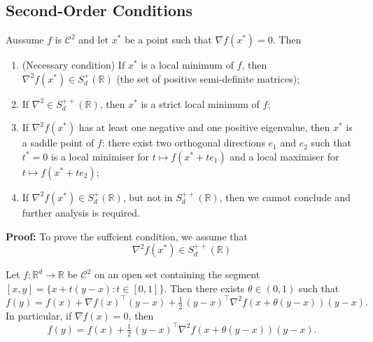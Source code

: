 \subsection{Second-Order Conditions}
Aussume \(f\) is \(\mathscr{C}^2\) and let \(x^*\) be a point such that \(\nabla f(x^*) = 0\). Then
\begin{enumerate}
    \item (Necessary condition) If \(x^*\) is a local minimum of \(f\), then \(\nabla^2 f(x^*) \in S_d^{+}(\mathbb{R})\) (the set of positive semi-definite matrices);
    \item If \(\nabla^2 \in S_d^{++}(\mathbb{R})\), then \(x^*\) is a strict local minimum of \(f\);
    \item If \(\nabla^2 f(x^*)\) has at least one negative and one positive eigenvalue, then \(x^*\) is a saddle point of \(f\): there exist 
    two orthogonal directions \(e_1\) and \(e_2\) such that \(t^*=0\) is a local minimiser for \(t \mapsto f(x^*+te_1)\) and a local maximiser for \(t \mapsto f(x^*+te_2)\);
    \item If \(\nabla^2 f(x^*) \in S_d^{+}(\mathbb{R})\), but not in \(S_d^{++}(\mathbb{R})\), then we cannot conclude and further analysis is required.
\end{enumerate}

\textbf{Proof:} To prove the suffcient condition, we assume that 
    \begin{equation}
        \nabla^2 f(x^*) \in S_d^{++}(\mathbb{R})
        \label{eq:posdef}
    \end{equation}

    \begin{proposition}
        Let $f:\mathbb{R}^d\to\mathbb{R}$ be $\mathscr{C}^2$ on an open set containing the segment $[x,y]=\{x+t(y-x):t\in[0,1]\}$. Then there exists $\theta\in(0,1)$ such that
        \[
        f(y)=f(x)+\nabla f(x)^{\top}(y-x)+\tfrac12\,(y-x)^{\top}\nabla^2 f\!\left(x+\theta(y-x)\right)(y-x).
        \]
        In particular, if $\nabla f(x)=0$, then
        \[
        f(y)=f(x)+\tfrac12\,(y-x)^{\top}\nabla^2 f\!\left(x+\theta(y-x)\right)(y-x).
        \]
    \end{proposition}


